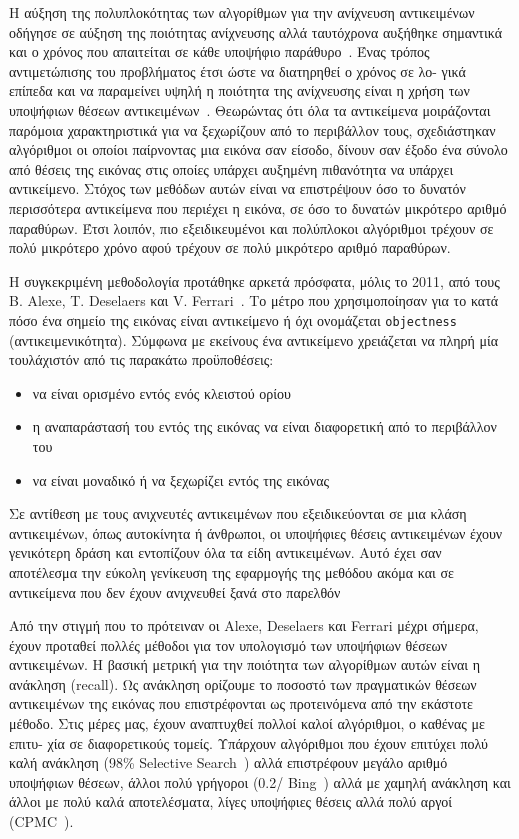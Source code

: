 Η αύξηση της πολυπλοκότητας των αλγορίθμων για την ανίχνευση αντικειμένων
οδήγησε σε αύξηση της ποιότητας ανίχνευσης αλλά ταυτόχρονα αυξήθηκε σημαντικά
και ο χρόνος που απαιτείται σε κάθε υποψήφιο παράθυρο~\cite{}. Ένας
τρόπος αντιμετώπισης του προβλήματος έτσι ώστε να διατηρηθεί ο χρόνος σε λο-
γικά επίπεδα και να παραμείνει υψηλή η ποιότητα της ανίχνευσης είναι η χρήση των
υποψήφιων θέσεων αντικειμένων~\cite{6544186, 6126456}. Θεωρώντας ότι όλα τα αντικείμενα
μοιράζονται παρόμοια χαρακτηριστικά για να ξεχωρίζουν από το περιβάλλον τους,
σχεδιάστηκαν αλγόριθμοι οι οποίοι παίρνοντας μια εικόνα σαν είσοδο, δίνουν σαν
έξοδο ένα σύνολο από θέσεις της εικόνας στις οποίες υπάρχει αυξημένη πιθανότητα
να υπάρχει αντικείμενο. Στόχος των μεθόδων αυτών είναι να επιστρέψουν
όσο το δυνατόν περισσότερα αντικείμενα που περιέχει η εικόνα, σε όσο το δυνατών
μικρότερο αριθμό παραθύρων. Έτσι λοιπόν, πιο εξειδικευμένοι και πολύπλοκοι αλγόριθμοι
τρέχουν σε πολύ μικρότερο χρόνο αφού τρέχουν σε πολύ μικρότερο αριθμό
παραθύρων.

Η συγκεκριμένη μεθοδολογία προτάθηκε αρκετά πρόσφατα, μόλις το 2011, από
τους B. Alexe, T. Deselaers και V. Ferrari~\cite{6133291}. Το μέτρο που
χρησιμοποίησαν για το κατά πόσο ένα σημείο της εικόνας είναι αντικείμενο ή όχι
ονομάζεται \texttt{objectness} (αντικειμενικότητα). Σύμφωνα με εκείνους ένα
αντικείμενο χρειάζεται να πληρή μία τουλάχιστόν από τις παρακάτω προϋποθέσεις:

\begin{itemize}
    \item να είναι ορισμένο εντός ενός κλειστού ορίου
    \item η αναπαράστασή του εντός της εικόνας να είναι διαφορετική από το περιβάλλον του
    \item να είναι μοναδικό ή να ξεχωρίζει εντός της εικόνας
\end{itemize}

Σε αντίθεση με τους ανιχνευτές αντικειμένων που εξειδικεύονται σε μια κλάση
αντικειμένων, όπως αυτοκίνητα ή άνθρωποι, οι υποψήφιες θέσεις αντικειμένων
έχουν γενικότερη δράση και εντοπίζουν όλα τα είδη αντικειμένων. Αυτό έχει σαν
αποτέλεσμα την εύκολη γενίκευση της εφαρμογής της μεθόδου ακόμα και σε αντικείμενα
που δεν έχουν ανιχνευθεί ξανά στο παρελθόν

Από την στιγμή που το πρότειναν οι Alexe, Deselaers και Ferrari μέχρι σήμερα, έχουν
προταθεί πολλές μέθοδοι για τον υπολογισμό των υποψήφιων θέσεων αντικειμένων. Η
βασική μετρική για την ποιότητα των αλγορίθμων αυτών είναι η ανάκληση (recall). Ως
ανάκληση ορίζουμε το ποσοστό των πραγματικών θέσεων αντικειμένων της εικόνας
που επιστρέφονται ως προτεινόμενα από την εκάστοτε μέθοδο.
Στις μέρες μας, έχουν αναπτυχθεί πολλοί καλοί αλγόριθμοι, ο καθένας με επιτυ-
χία σε διαφορετικούς τομείς. Υπάρχουν αλγόριθμοι που έχουν επιτύχει πολύ καλή
ανάκληση (98\% Selective Search~\cite{UijlingsIJCV2013}) αλλά επιστρέφουν μεγάλο αριθμό υποψήφιων
θέσεων, άλλοι πολύ γρήγοροι (0.2/ Bing~\cite{6909816}) αλλά με χαμηλή ανάκληση και άλλοι
με πολύ καλά αποτελέσματα, λίγες υποψήφιες θέσεις αλλά πολύ αργοί (CPMC~\cite{6095566}).


